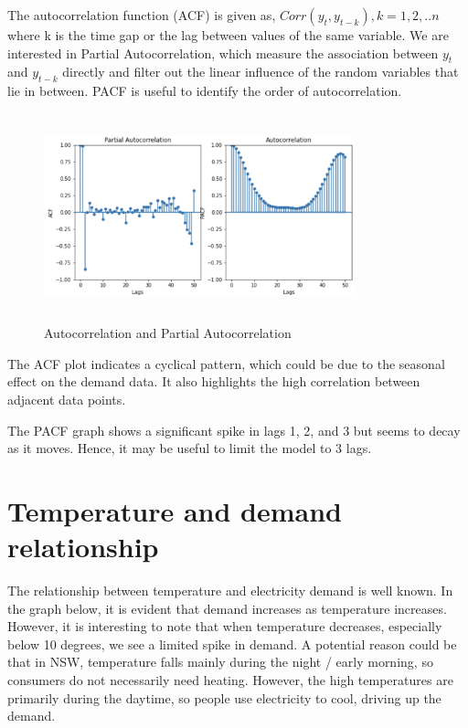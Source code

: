 \documentclass[mstat,12pt]{unswthesis}
\begin{document}
The autocorrelation function (ACF) is given as,
\(Corr(y_t,y_{t-k}),k=1,2,..n\) \cite{nist_2020_13512} where k is the
time gap or the lag between values of the same variable. We are
interested in Partial Autocorrelation, which measure the association
between \(y_t\) and \(y_{t-k}\) directly and filter out the linear
influence of the random variables that lie in between. PACF is useful to
identify the order of autocorrelation.

\begin{figure}[H]
\centering
\includegraphics[width=0.80\textwidth,height=6cm]{autocorrelation.png}
\caption{Autocorrelation and Partial Autocorrelation}
\label{autocorrelation}
\end{figure}

The ACF plot indicates a cyclical pattern, which could be due to the
seasonal effect on the demand data. It also highlights the high
correlation between adjacent data points.

The PACF graph shows a significant spike in lags 1, 2, and 3 but seems
to decay as it moves. Hence, it may be useful to limit the model to 3
lags.

\section{Temperature and demand
relationship}\label{temperature-and-demand-relationship}

The relationship between temperature and electricity demand is well
known. In the graph below, it is evident that demand increases as
temperature increases. However, it is interesting to note that when
temperature decreases, especially below 10 degrees, we see a limited
spike in demand. A potential reason could be that in NSW, temperature
falls mainly during the night / early morning, so consumers do not
necessarily need heating. However, the high temperatures are primarily
during the daytime, so people use electricity to cool, driving up the
demand.
\end{document}
